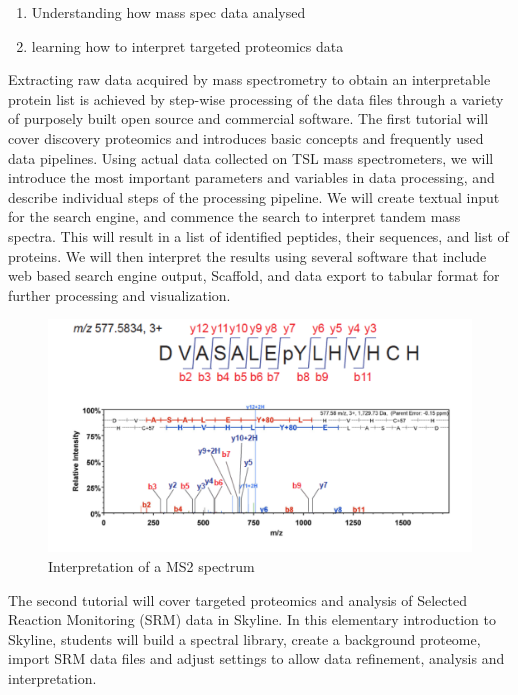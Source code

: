 \documentclass[12pt,]{book}
\providecommand{\tightlist}{%
  \setlength{\itemsep}{0pt}\setlength{\parskip}{0pt}}
\theoremstyle{definition}
\theoremstyle{definition}
\theoremstyle{remark}
\begin{document}
\begin{enumerate}
\def\labelenumi{\arabic{enumi}.}
\tightlist
\item
  Understanding how mass spec data analysed
\item
  learning how to interpret targeted proteomics data
\end{enumerate}

Extracting raw data acquired by mass spectrometry to obtain an
interpretable protein list is achieved by step-wise processing of the
data files through a variety of purposely built open source and
commercial software. The first tutorial will cover discovery proteomics
and introduces basic concepts and frequently used data pipelines. Using
actual data collected on TSL mass spectrometers, we will introduce the
most important parameters and variables in data processing, and describe
individual steps of the processing pipeline. We will create textual
input for the search engine, and commence the search to interpret tandem
mass spectra. This will result in a list of identified peptides, their
sequences, and list of proteins. We will then interpret the results
using several software that include web based search engine output,
Scaffold, and data export to tabular format for further processing and
visualization.

\begin{figure}
\includegraphics[width=6.06in]{assets/prot2} \caption{Interpretation of a MS2 spectrum}\label{fig:pracp}
\end{figure}

The second tutorial will cover targeted proteomics and analysis of
Selected Reaction Monitoring (SRM) data in Skyline. In this elementary
introduction to Skyline, students will build a spectral library, create
a background proteome, import SRM data files and adjust settings to
allow data refinement, analysis and interpretation.
\end{document}
